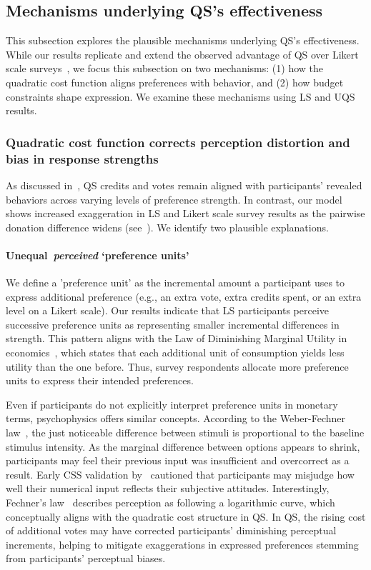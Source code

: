\subsection{Mechanisms underlying QS's effectiveness}
This subsection explores the plausible mechanisms underlying QS's effectiveness. While our results replicate and extend the observed advantage of QS over Likert scale surveys~\cite{chengCanShowWhat2021}, we focus this subsection on two mechanisms: (1) how the quadratic cost function aligns preferences with behavior, and (2) how budget constraints shape expression. We examine these mechanisms using LS and UQS results.

\subsubsection{Quadratic cost function corrects perception distortion and bias in response strengths}
As discussed in~, QS credits and votes remain aligned with participants' revealed behaviors across varying levels of preference strength. In contrast, our model shows increased exaggeration in LS and Likert scale survey results as the pairwise donation difference widens (see~). We identify two plausible explanations.

\paragraph{Unequal~\textit{perceived} `preference units'}
We define a 'preference unit' as the incremental amount a participant uses to express additional preference (e.g., an extra vote, extra credits spent, or an extra level on a Likert scale). Our results indicate that LS participants perceive successive preference units as representing smaller incremental differences in strength. This pattern aligns with the Law of Diminishing Marginal Utility in economics~\cite{gossen1983laws, kahnemanProspectTheoryAnalysis1979}, which states that each additional unit of consumption yields less utility than the one before. Thus, survey respondents allocate more preference units to express their intended preferences.

Even if participants do not explicitly interpret preference units in monetary terms, psychophysics offers similar concepts. According to the Weber-Fechner law~\cite{dehaeneNeuralBasisWeber2003, kruegerReconcilingFechnerStevens1989}, the just noticeable difference between stimuli is proportional to the baseline stimulus intensity. As the marginal difference between options appears to shrink, participants may feel their previous input was insufficient and overcorrect as a result. Early CSS validation by~\citet{dudekValidityPointAssignmentProcedure1957} cautioned that participants may misjudge how well their numerical input reflects their subjective attitudes. Interestingly, Fechner's law~\cite{kruegerReconcilingFechnerStevens1989} describes perception as following a logarithmic curve, which conceptually aligns with the quadratic cost structure in QS. In QS, the rising cost of additional votes may have corrected participants' diminishing perceptual increments, helping to mitigate exaggerations in expressed preferences stemming from participants' perceptual biases.

